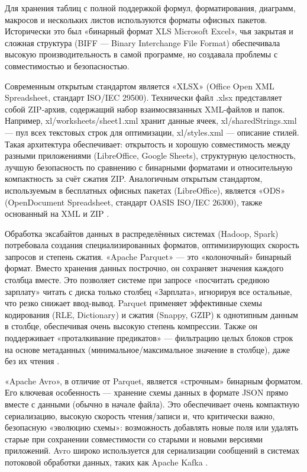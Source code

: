 \documentclass{SibFU-docs}
\begin{document}

Для хранения таблиц с полной поддержкой формул, форматирования, диаграмм, макросов и нескольких листов используются форматы офисных пакетов. Исторически это был «бинарный формат XLS Microsoft Excel», чья закрытая и сложная структура (BIFF --- Binary Interchange File Format) обеспечивала высокую производительность в самой программе, но создавала проблемы с совместимостью и безопасностью.

Современным открытым стандартом является «XLSX» (Office Open XML Spreadsheet, стандарт ISO/IEC 29500). Технически файл .xlsx представляет собой ZIP-архив, содержащий набор взаимосвязанных XML-файлов и папок. Например, xl/worksheets/sheet1.xml хранит данные ячеек, xl/sharedStrings.xml --- пул всех текстовых строк для оптимизации, xl/styles.xml --- описание стилей. Такая архитектура обеспечивает: открытость и хорошую совместимость между разными приложениями (LibreOffice, Google Sheets), структурную целостность, лучшую безопасность по сравнению с бинарными форматами и относительную компактность за счёт сжатия ZIP. Аналогичным открытым стандартом, используемым в бесплатных офисных пакетах (LibreOffice), является «ODS» (OpenDocument Spreadsheet, стандарт OASIS ISO/IEC 26300), также основанный на XML и ZIP \cite{ecma_office_open_xml_2016, quadratic_common_file_formats_2025}.


Обработка эксабайтов данных в распределённых системах (Hadoop, Spark) потребовала создания специализированных форматов, оптимизирующих скорость запросов и степень сжатия. «Apache Parquet» --- это «колоночный» бинарный формат. Вместо хранения данных построчно, он сохраняет значения каждого столбца вместе. Это позволяет системе при запросе «посчитать среднюю зарплату» читать с диска только столбец «Зарплата», игнорируя все остальные, что резко снижает ввод-вывод. Parquet применяет эффективные схемы кодирования (RLE, Dictionary) и сжатия (Snappy, GZIP) к однотипным данным в столбце, обеспечивая очень высокую степень компрессии. Также он поддерживает «проталкивание предикатов» --- фильтрацию целых блоков строк на основе метаданных (минимальное/максимальное значение в столбце), даже без их чтения \cite{apache_parquet_format}.

«Apache Avro», в отличие от Parquet, является «строчным» бинарным форматом. Его ключевая особенность --- хранение схемы данных в формате JSON прямо вместе с данными (обычно в начале файла). Это обеспечивает очень компактную сериализацию, высокую скорость чтения/записи и, что критически важно, безопасную «эволюцию схемы»: возможность добавлять новые поля или удалять старые при сохранении совместимости со старыми и новыми версиями приложений. Avro широко используется для сериализации сообщений в системах потоковой обработки данных, таких как Apache Kafka \cite{apache_parquet_format}.
\end{document}
